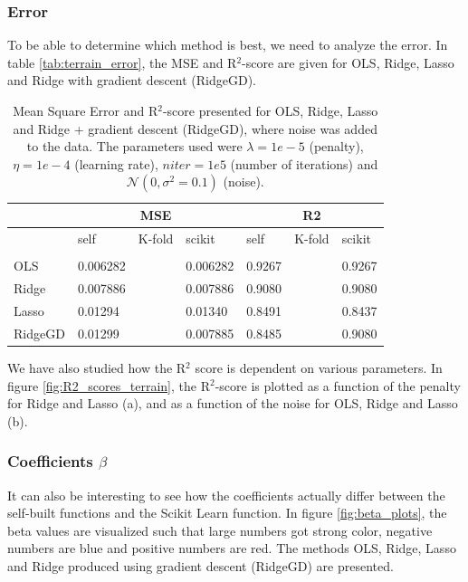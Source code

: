 \subsubsection{Error}
To be able to determine which method is best, we need to analyze the error. In table \eqref{tab:terrain_error}, the MSE and R$^2$-score are given for OLS, Ridge, Lasso and Ridge with gradient descent (RidgeGD). 

\begin{table} [H]
	\caption{Mean Square Error and R$^2$-score presented for OLS, Ridge, Lasso and Ridge + gradient descent (RidgeGD), where noise was added to the data. The parameters used were $\lambda=1e-5$ (penalty), $\eta=1e-4$ (learning rate), $niter=1e5$ (number of iterations) and $\mathcal{N}(0, \sigma^2=0.1)$ (noise). \vspace{2mm}}
	\begin{tabularx}{\textwidth}{l|XXX|XXX} \hline\hline
		\label{tab:terrain_error}
		& \multicolumn{3}{c}{\textbf{MSE}}&\multicolumn{3}{c}{\textbf{R2}}\\ \hline
		&self&K-fold&scikit&self&K-fold&scikit\\ \hline \\
		OLS & 0.006282 && 0.006282 & 0.9267 && 0.9267\\
		Ridge & 0.007886 && 0.007886 & 0.9080 && 0.9080 \\
		Lasso & 0.01294 && 0.01340 & 0.8491 && 0.8437 \\
		RidgeGD & 0.01299 && 0.007885 & 0.8485 && 0.9080 \\ \hline
	\end{tabularx}
\end{table}

We have also studied how the R$^2$ score is dependent on various parameters. In figure \eqref{fig:R2_scores_terrain}, the R$^2$-score is plotted as a function of the penalty for Ridge and Lasso (a), and as a function of the noise for OLS, Ridge and Lasso (b).


\iffalse
\subsubsection{Coefficients $\beta$}
It can also be interesting to see how the coefficients actually differ between the self-built functions and the Scikit Learn function. In figure \eqref{fig:beta_plots}, the beta values are visualized such that large numbers got strong color, negative numbers are blue and positive numbers are red. The methods OLS, Ridge, Lasso and Ridge produced using gradient descent (RidgeGD) are presented. 

